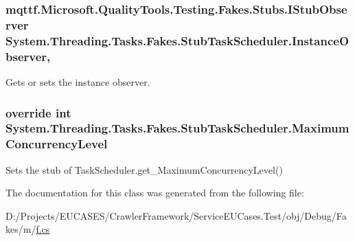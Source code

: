 \hypertarget{class_system_1_1_threading_1_1_tasks_1_1_fakes_1_1_stub_task_scheduler_a3c14e2fa639f268134c433cddee506ee}{
\subsubsection[{Instance\-Observer}]{\setlength{\rightskip}{0pt plus 5cm}mqttf.\-Microsoft.\-Quality\-Tools.\-Testing.\-Fakes.\-Stubs.\-I\-Stub\-Observer System.\-Threading.\-Tasks.\-Fakes.\-Stub\-Task\-Scheduler.\-Instance\-Observer\hspace{0.3cm}{\ttfamily [get]}, {\ttfamily [set]}}}\label{class_system_1_1_threading_1_1_tasks_1_1_fakes_1_1_stub_task_scheduler_a3c14e2fa639f268134c433cddee506ee}


Gets or sets the instance observer.

\hypertarget{class_system_1_1_threading_1_1_tasks_1_1_fakes_1_1_stub_task_scheduler_a8de52c9f854709533d5d3e5f4ef4e6d6}{
\subsubsection[{Maximum\-Concurrency\-Level}]{\setlength{\rightskip}{0pt plus 5cm}override int System.\-Threading.\-Tasks.\-Fakes.\-Stub\-Task\-Scheduler.\-Maximum\-Concurrency\-Level\hspace{0.3cm}{\ttfamily [get]}}}\label{class_system_1_1_threading_1_1_tasks_1_1_fakes_1_1_stub_task_scheduler_a8de52c9f854709533d5d3e5f4ef4e6d6}


Sets the stub of Task\-Scheduler.\-get\-\_\-\-Maximum\-Concurrency\-Level()



The documentation for this class was generated from the following file\-:\begin{DoxyCompactItemize}
\item 
D\-:/\-Projects/\-E\-U\-C\-A\-S\-E\-S/\-Crawler\-Framework/\-Service\-E\-U\-Cases.\-Test/obj/\-Debug/\-Fakes/m/\hyperlink{m_2f_8cs}{f.\-cs}\end{DoxyCompactItemize}

